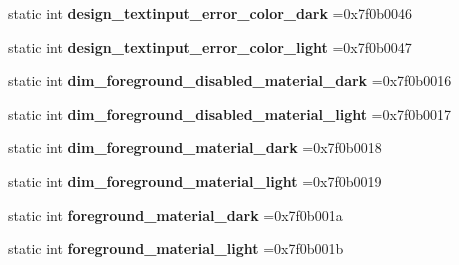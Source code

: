 \begin{DoxyCompactItemize}
\item 
\mbox{\label{classandroid_1_1support_1_1v4_1_1R_1_1color_a743dda138d594d0d0b2f0dd34f41362f}} 
static int {\bfseries design\+\_\+textinput\+\_\+error\+\_\+color\+\_\+dark} =0x7f0b0046
\item 
\mbox{\label{classandroid_1_1support_1_1v4_1_1R_1_1color_aa6af32ba12ebb0610f5e392581b3e2c2}} 
static int {\bfseries design\+\_\+textinput\+\_\+error\+\_\+color\+\_\+light} =0x7f0b0047
\item 
\mbox{\label{classandroid_1_1support_1_1v4_1_1R_1_1color_ab2f783717c5125f62d3e3342a267689c}} 
static int {\bfseries dim\+\_\+foreground\+\_\+disabled\+\_\+material\+\_\+dark} =0x7f0b0016
\item 
\mbox{\label{classandroid_1_1support_1_1v4_1_1R_1_1color_aaaab0270c2c95f4e8c7a8ad2e75e2555}} 
static int {\bfseries dim\+\_\+foreground\+\_\+disabled\+\_\+material\+\_\+light} =0x7f0b0017
\item 
\mbox{\label{classandroid_1_1support_1_1v4_1_1R_1_1color_a25fcfec1190e560cf5987d160a0d60e6}} 
static int {\bfseries dim\+\_\+foreground\+\_\+material\+\_\+dark} =0x7f0b0018
\item 
\mbox{\label{classandroid_1_1support_1_1v4_1_1R_1_1color_a41ecf1ff24f61413e26b7935d706deea}} 
static int {\bfseries dim\+\_\+foreground\+\_\+material\+\_\+light} =0x7f0b0019
\item 
\mbox{\label{classandroid_1_1support_1_1v4_1_1R_1_1color_a4ea5d885f35d57f0570b7c15839cdb64}} 
static int {\bfseries foreground\+\_\+material\+\_\+dark} =0x7f0b001a
\item 
\mbox{\label{classandroid_1_1support_1_1v4_1_1R_1_1color_ace01325d29e5a020d23d3d26c9a2d125}} 
static int {\bfseries foreground\+\_\+material\+\_\+light} =0x7f0b001b
\item 
\mbox{\label{classandroid_1_1support_1_1v4_1_1R_1_1color_a39e741764443428db2ccb9967134f288}} 

\end{DoxyCompactItemize}

